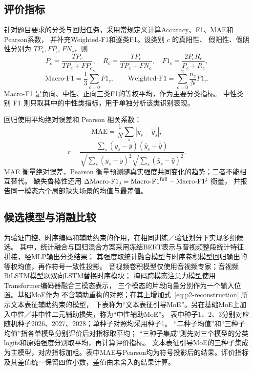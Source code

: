 \documentclass[bwprint]{gmcmthesis}
\begin{document}
\subsection{评价指标}

针对题目要求的分类与回归任务，采用常规定义计算Accuracy、F1、MAE和Pearson系数，
并补充Weighted-F1和逐类F1。设类别 $c$ 的真阳性、
假阳性、假阴性分别为 $TP_c,FP_c,FN_c$，则
\begin{equation}
 P_c=\frac{TP_c}{TP_c+FP_c},\quad R_c=\frac{TP_c}{TP_c+FN_c},\quad
 F1_c=\frac{2P_cR_c}{P_c+R_c},
 \label{eq:p2-class-metrics}
\end{equation}
\begin{equation}
 \text{Macro-F1}=\frac13\sum_{c=0}^{2}F1_c,\qquad
 \text{Weighted-F1}=\sum_{c=0}^{2}\frac{n_c}{N}F1_c.
 \label{eq:p2-f1-summary}
\end{equation}
Macro-F1 是负向、中性、正向三类F1的等权平均，作为主要分类指标。
中性类别 F1 则只取其中的中性类指标，用于单独分析该类识别表现。

回归使用平均绝对误差和 Pearson 相关系数：
\begin{equation}
 \mathrm{MAE}=\frac1N\sum_s|y_s-\hat y_s|,
 \label{eq:p2-mae}
\end{equation}
\begin{equation}
 r=\frac{\sum_s(y_s-\bar y)(\hat y_s-\overline{\hat y})}
 {\sqrt{\sum_s(y_s-\bar y)^2}\sqrt{\sum_s(\hat y_s-\overline{\hat y})^2}}.
 \label{eq:p2-pearson}
\end{equation}
MAE 衡量绝对误差，Pearson 衡量预测随真实强度共同变化的趋势；二者不能相互替代。
缺失鲁棒性还用 $\Delta\text{Macro-F1}_j=\text{Macro-F1}^{\rm full}-\text{Macro-F1}^j$ 衡量，
并报告同一模态六个局部缺失场景的均值与最差值。

\subsection{候选模型与消融比较}

为验证门控、时序编码和辅助约束的作用，在相同训练／验证划分下实现多组候选。
其中，统计融合与回归混合方案采用冻结BERT表示与音视频整段统计特征拼接，经MLP输出分类结果；
其强度取统计融合模型与时序卷积模型回归输出的等权均值，再作符号一致性投影。
音视频卷积模型仅使用音视频专家；音视频BiLSTM模型以双向LSTM替换时序模块\citep{goodfellow2016deep}；
掩码跨模态注意力模型使用Transformer编码器\citep{vaswani2017attention}融合三模态表示，
三个模态的片段向量分别作为一个输入位置。基础MoE作为
不含辅助重构的对照；在其上增加式~\eqref{eq:p2-reconstruction} 所示文本表征辅助约束的模型，
下表称为“文本表征引导MoE”。另在基础MoE上加入中性／非中性二元辅助损失，称为“中性辅助MoE”。
表中种子1、2、3分别对应随机种子2026、2027、2028；单种子对照均采用种子1。
“二种子均值”和“三种子均值”指各单模型分别评价后对指标取平均；
“三种子集成”则先对三个模型的分类logits和原始强度分别取平均，再计算评价指标。
文本表征引导MoE的三种子集成为主模型，对应指标加粗。表中MAE与Pearson均为符号投影后的结果。评价指标及其差值统一保留四位小数，差值由未舍入的结果计算。
\end{document}
